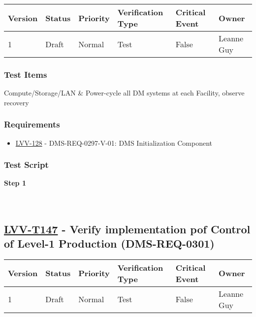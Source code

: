 \begin{longtable}[]{@{}llllll@{}}
\toprule
Version & Status & Priority & Verification Type & Critical Event &
Owner\tabularnewline
\midrule
\endhead
1 & Draft & Normal & Test & False & Leanne Guy\tabularnewline
\bottomrule
\end{longtable}

\hypertarget{test-items-46}{%
\subsubsection{Test Items}\label{test-items-46}}

Compute/Storage/LAN \& Power-cycle all DM systems at each Facility,
observe recovery

\hypertarget{requirements-46}{%
\subsubsection{Requirements}\label{requirements-46}}

\begin{itemize}
\tightlist
\item
  \href{https://jira.lsstcorp.org/browse/LVV-128}{LVV-128} -
  DMS-REQ-0297-V-01: DMS Initialization Component
\end{itemize}

\hypertarget{test-script-46}{%
\subsubsection{Test Script}\label{test-script-46}}

\textbf{Step 1}\\
~\\
~\\

\hypertarget{lvv-t147---verify-implementation-pof-control-of-level-1-production-dms-req-0301}{%
\subsection{\texorpdfstring{\href{https://jira.lsstcorp.org/secure/Tests.jspa\#/testCase/LVV-T147}{LVV-T147}
- Verify implementation pof Control of Level-1 Production
(DMS-REQ-0301)}{LVV-T147 - Verify implementation pof Control of Level-1 Production (DMS-REQ-0301)}}\label{lvv-t147---verify-implementation-pof-control-of-level-1-production-dms-req-0301}}

\begin{longtable}[]{@{}llllll@{}}
\toprule
Version & Status & Priority & Verification Type & Critical Event &
Owner\tabularnewline
\midrule
\endhead
1 & Draft & Normal & Test & False & Leanne Guy\tabularnewline
\bottomrule
\end{longtable}

